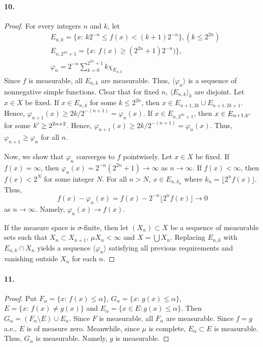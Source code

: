   \paragraph{10.}
  \begin{proof}
    For every integers $n$ and $k$, let
    \begin{align*}
      &E_{n,k}=\{x:\, k2^{-n}\le f(x)<(k+1)2^{-n}\}, (k\le 2^{2n})\\
      &E_{n,2^{2n}+1}=\{x:\, f(x)\ge(2^{2n}+1)2^{-n})\},\\
      &\varphi_n=2^{-n}\sum_{k=0}^{2^{2n}+1}k\chi_{E_{n,k}}
    \end{align*}
    Since $f$ is measurable, all $E_{n,k}$ are measurable. Thus, $\langle
    \varphi_n\rangle$ is a sequence of nonnegative simple functions. Clear that 
    for fixed $n$, $\langle E_{n,k}\rangle_k$ are disjoint. Let $x\in X$ be 
    fixed. If $x\in E_{n,k}$ for some $k\le 2^{2n}$, then $x\in E_{n+1,2k}\cup
    E_{n+1,2k+1}$. Hence, $\varphi_{n+1}(x)\ge 2k/2^{-(n+1)}=\varphi_n(x)$. If
    $x\in E_{n,2^{2n}+1}$, then $x\in E_{n+1,k^\prime}$ for some $k^\prime\ge
    2^{2n+2}$. Hence, $\varphi_{n+1}(x)\ge 2k/2^{-(n+1)}=\varphi_n(x)$. Thus,
    $\varphi_{n+1}\ge\varphi_n$ for all $n$.\par
    Now, we show that $\varphi_n$ converges to $f$ pointwisely. Let $x\in X$ be
    fixed. If $f(x)=\infty$, then $\varphi_n(x)=2^{-n}(2^{2n}+1)\to\infty$ as
    $n\to\infty$. If $f(x)<\infty$, then $f(x)<2^{N}$ for some integer $N$. 
    For all $n>N$, $x\in E_{n,k_n}$ where $k_n=\lfloor 2^nf(x)\rfloor$. Thus,
    \[
      f(x)-\varphi_n(x)=f(x)-2^{-n}\lfloor 2^nf(x)\rfloor\to 0
    \]
    as $n\to\infty$. Namely, $\varphi_n(x)\to f(x)$.\par
    If the measure space is $\sigma$-finite, then let $(X_n)\subset X$ be a
    sequence of measurable sets such that $X_n\subset X_{n+1}$, $\mu X_n<
    \infty$ and $X=\bigcup X_n$. Replacing $E_{n,k}$ with $E_{n,k}\cap X_n$ 
    yields a sequence $\langle\varphi_n\rangle$ satisfying all previous 
    requirements and vanishing outside $X_n$ for each $n$.
  \end{proof}
  
  \paragraph{11.}
  \begin{proof}
    Put $F_\alpha=\{x:\,f(x)\le\alpha\}$, $G_\alpha=\{x:\,g(x)\le\alpha\}$, 
    $E=\{x:\,f(x)\ne g(x)\}$ and $E_\alpha=\{x\in E: g(x)\le\alpha\}$. Then
    $G_\alpha=(F_\alpha\setminus E)\cup E_\alpha$. Since $F$ is measurable, all
    $F_\alpha$ are measurable. Since $f=g$ a.e., $E$ is of measure zero. 
    Meanwhile, since $\mu$ is complete, $E_\alpha\subset E$ is measurable. 
    Thus, $G_\alpha$ is measurable. Namely, $g$ is measurable.
  \end{proof}
  
